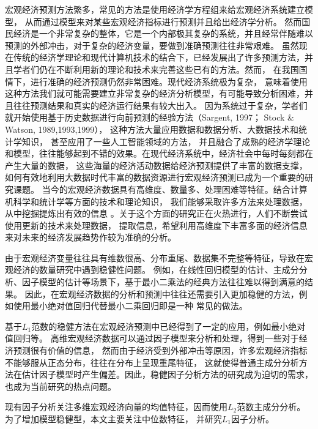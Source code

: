 宏观经济预测方法繁多，常见的方法是使用经济学方程组来给宏观经济系统建立模型\cite{郭崇慧2001宏观经济预测模型体系研究}，
从而通过模型来对某些宏观经济指标进行预测并且给出经济学分析。
然而国民经济是一个非常复杂的整体，它是一个内部极其复杂的系统，并且经常伴随难以预测的外部冲击，对于复杂的经济变量，要做到准确预测往往非常艰难。
虽然现在传统的经济学理论和现代计算机技术的结合下，已经发展出了许多预测方法，并且学者们仍在不断利用新的理论和技术来完善这些已有的方法。然而，
在我国国情下，进行准确的经济预测仍然非常困难。现代经济系统极为复杂，
意味着使用这种方法我们就可能需要建立非常复杂的经济分析模型，有可能导致分析困难，并且往往预测结果和真实的经济运行结果有较大出入。
因为系统过于复杂，学者们就开始使用基于历史数据进行向前预测的经验方法（Sargent, 1997\cite{sargent1977business}；
Stock \& Watson, 1989\cite{stock1989new},1993\cite{stock1993simple},1999\cite{stock1999forecasting}\cite{stock1999business}），
这种方法大量应用数据和数据分析、大数据技术和统计学知识，
甚至应用了一些人工智能领域的方法\cite{王维2000人工神经网络在非线性经济预测中的应用}，
并且融合了成熟的经济学理论和模型\cite{白仲林2014两类}，往往能够起到不错的效果。在现代经济系统中，经济社会中每时每刻都在产生大量的数据，
这些海量的经济活动数据给经济预测提供了丰富的数据支撑，如何有效地利用大数据时代丰富的数据资源进行宏观经济预测已成为一个重要的研究课题。
当今的宏观经济数据具有高维度、数量多、处理困难等特征。结合计算机科学和统计学等方面的技术和理论知识，
我们能够采取许多方法来处理数据，从中挖掘提炼出有效的信息\cite{hofmarcher2019macroeconomic}
。关于这个方面的研究正在火热进行，人们不断尝试使用更新的技术来处理数据，
提取信息，希望利用高维度下丰富多面的经济信息来对未来的经济发展趋势作较为准确的分析。

由于宏观经济变量往往具有维数很高、分布重尾、数据集不完整等特征\cite{qiu2015robust}，导致在宏观经济的数量研究中遇到稳健性问题。
例如，在线性回归模型的估计、主成分分析、因子模型的估计等场景下，基于最小二乘法的经典方法往往难以得到满意的结果。
因此，在宏观经济数据的分析和预测中往往还需要引入更加稳健的方法，例如使用最小绝对值回归代替最小二乘回归即是一种
常见的做法。

基于$L_1$范数的稳健方法在宏观经济预测中已经得到了一定的应用，例如最小绝对值回归等。
高维宏观经济数据可以通过因子模型来分析和处理，得到一些对于经济预测很有价值的信息，
然而由于经济受到外部冲击等原因，许多宏观经济指标不能够服从正态分布，往往在分布上呈现重尾特征，
这就使得普通主成分分析方法在估计因子模型时产生偏差。因此，稳健因子分析方法的研究成为迫切的需求，
也成为当前研究的热点问题。

现有因子分析关注多维宏观经济向量的均值特征，因而使用$L_2$范数主成分分析。为了增加模型稳健型，本文主要关注中位数特征，
并研究$L_1$因子分析。


